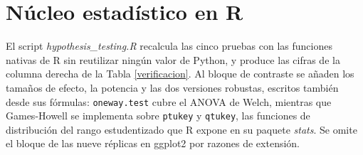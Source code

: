 \section{Núcleo estadístico en R}
    \label{anexo_r}
    El script \textit{hypothesis\_testing.R} recalcula las cinco pruebas con las
    funciones nativas de R sin reutilizar ningún valor de Python, y produce las
    cifras de la columna derecha de la Tabla \ref{verificacion}. Al bloque de
    contraste se añaden los tamaños de efecto, la potencia y las dos versiones
    robustas, escritos también desde sus fórmulas: \texttt{oneway.test} cubre el
    ANOVA de Welch, mientras que Games-Howell se implementa sobre
    \texttt{ptukey} y \texttt{qtukey}, las funciones de distribución del rango
    estudentizado que R expone en su paquete \textit{stats}. Se omite el bloque
    de las nueve réplicas en ggplot2 por razones de extensión.

    \vspace{10pt}

    
